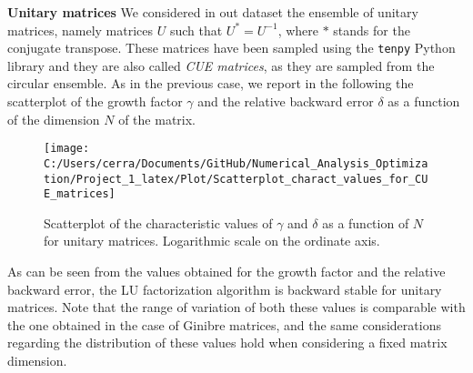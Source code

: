 \documentclass[a4paper,11pt]{report}
\begin{document}
\noindent \textbf{Unitary matrices } We considered in out dataset the ensemble of unitary matrices, namely matrices $U$ such that $U^{*} = U^{-1}$, where $*$ stands for the conjugate transpose. These matrices have been sampled using the \texttt{tenpy} Python library and they are also called \textit{CUE matrices}, as they are sampled from the circular ensemble. As in the previous case, we report in the following the scatterplot of the growth factor $\gamma$ and the relative backward error $\delta$ as a function of the dimension $N$ of the matrix.
\begin{figure}[H]
	\centering
	\texttt{[image: C:/Users/cerra/Documents/GitHub/Numerical\_Analysis\_Optimization/Project\_1\_latex/Plot/Scatterplot\_charact\_values\_for\_CUE\_matrices]}
	\caption{Scatterplot of the characteristic values of $\gamma$ and $\delta$ as a function of $N$ for unitary matrices. Logarithmic scale on the ordinate axis.}
	\label{fig:Scatterplot_CUE}
\end{figure}
\noindent As can be seen from the values obtained for the growth factor and the relative backward error, the LU factorization algorithm is backward stable for unitary matrices. Note that the range of variation of both these values is comparable with the one obtained in the case of Ginibre matrices, and the same considerations regarding the distribution of these values hold when considering a fixed matrix dimension.\\
%
\end{document}
